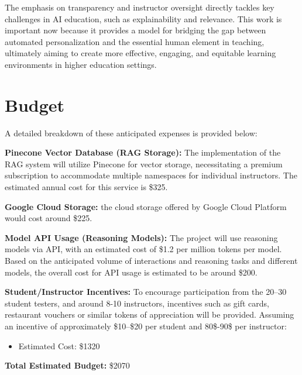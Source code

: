 \documentclass{stylefiles/capstone}
\begin{document}
The emphasis on transparency and instructor oversight directly tackles key challenges in AI education, such as explainability and relevance. This work is important now because it provides a model for bridging the gap between automated personalization and the essential human element in teaching, ultimately aiming to create more effective, engaging, and equitable learning environments in higher education settings.

\section{Budget}

A detailed breakdown of these anticipated expenses is provided below:

\textbf{Pinecone Vector Database (RAG Storage):}  
The implementation of the RAG system will utilize Pinecone for vector storage, necessitating a premium subscription to accommodate multiple namespaces for individual instructors. The estimated annual cost for this service is \$325.

\textbf{Google Cloud Storage:}  
the cloud storage offered by Google Cloud Platform would cost around  \$225.

\textbf{Model API Usage (Reasoning Models):}  
The project will use reasoning models via API, with an estimated cost of \$1.2 per million tokens per model. Based on the anticipated volume of interactions and reasoning tasks and different models, the overall cost for API usage is estimated to be around \$200.

\textbf{Student/Instructor Incentives:}  
To encourage participation from the 20--30 student testers, and around 8-10 instructors, incentives such as gift cards, restaurant vouchers or similar tokens of appreciation will be provided. Assuming an incentive of approximately \$10--\$20 per student and 80\$-90\$ per instructor:
\begin{itemize}
  \item Estimated Cost: \$1320
\end{itemize}

\textbf{Total Estimated Budget:} \$2070 






\end{document}
